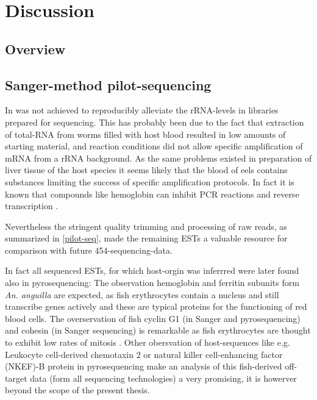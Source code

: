 
\chapter{Discussion} %



\ifpdf
    \graphicspath{{7/figures/PNG/}{7/figures/PDF/}{7/figures/}}
\else
    \graphicspath{{7/figures/EPS/}{7/figures/}}
\fi


\section{Overview}


\section{Sanger-method pilot-sequencing}
\label{sec:sanger-pil}

In was not achieved to reproducibly alleviate the rRNA-levels in
libraries prepared for sequencing. This has probably been due to the
fact that extraction of total-RNA from worms filled with host blood
resulted in low amounts of starting material, and reaction conditions
did not allow specific amplification of mRNA from a rRNA
background. As the same problems existed in preparation of liver
tissue of the host species it seems likely that the blood of eels
contains substances limiting the success of specific amplification
protocols. In fact it is known that compounds like hemoglobin can
inhibit PCR reactions \cite{pmid9327537} and reverse transcription
\cite{pmid16109794}.

Nevertheless the stringent quality trimming and processing of raw
reads, as summarized in \ref{pilot-seq}, made the remaining ESTs a
valuable resource for comparison with future 454-sequencing-data.

In fact all sequenced ESTs, for which host-orgin was inferrred were
later found also in pyrosequencing: The observation hemoglobin and
ferritin subunits form \textit{An. anguilla} are expected, as fish
erythrocytes contain a nucleus and still transcribe genes actively
\cite{pmid20614118} and these are typical proteins for the functioning
of red blood cells. The overservation of fish cyclin G1 (in Sanger and
pyrosequencing) and cohesin (in Sanger sequencing) is remarkable as
fish erythrocytes are thought to exhibit low rates of mitosis
\cite{pmid7506383}. Other obersvation of host-sequences like
e.g. Leukocyte cell-derived chemotaxin 2 or natural killer
cell-enhancing factor (NKEF)-B protein in pyrosequencing make an
analysis of this fish-derived off-target data (form all sequencing
technologies) a very promising, it is howerver beyond the scope of the
present thesis.

